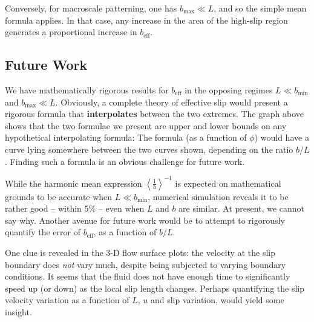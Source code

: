 \documentclass[a4paper]{report}
\newcommand{\beff}{\ensuremath{b_{\mathrm{eff}}}}
\newcommand{\bmin}{\ensuremath{b_{\mathrm{min}}}}
\newcommand{\bmax}{\ensuremath{b_{\mathrm{max}}}}
\begin{document}
Conversely, for macroscale patterning, one has $\bmax \ll L$, and so the simple mean formula applies.  In that case, any increase in the area of the high-slip region generates a proportional increase in $\beff$.



\subsection*{Future Work}

We have mathematically rigorous results for $\beff$ in the opposing regimes $L \ll \bmin$ and $\bmax \ll L$.  Obviously, a complete theory of effective slip would present a rigorous formula that \textbf{interpolates} between the two extremes.  The graph above shows that the two formulae we present are upper and lower bounds on any hypothetical interpolating formula:  The formula (as a function of $\phi$) would have a curve lying somewhere between the two curves shown, depending on the ratio $b/ L$.  Finding such a formula is an obvious challenge for future work.

\vspace*{1em}

While the harmonic mean expression $\left< \frac{1}{b} \right>^{-1}$ is expected on mathematical grounds to be accurate when $L \ll \bmin$, numerical simulation reveals it to be rather good -- within 5\% -- even when $L$ and $b$ are similar.  At present, we cannot say why.  Another avenue for future work would be to attempt to rigorously quantify the error of $\beff$, as a function of $b/L$.

One clue is revealed in the 3-D flow surface plots: the velocity at the slip boundary does \emph{not} vary much, despite being subjected to varying boundary conditions.  It seems that the fluid does not have enough time to significantly speed up (or down) as the local slip length changes.  Perhaps quantifying the slip velocity variation as a function of $L$, $u$ and slip variation, would yield some insight.
\end{document}
